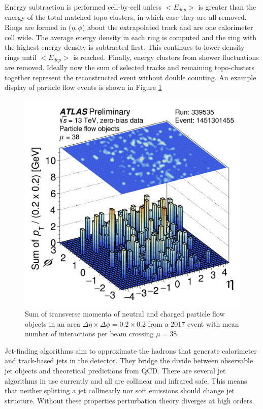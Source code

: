 Energy subtraction is performed cell-by-cell unless $<E_{dep}>$ is greater than the energy of the total matched topo-clusters, in which case they are all removed. Rings are formed in ($\eta,\phi$) about the extrapolated track and are one calorimeter cell wide. The average energy density in each ring is computed and the ring with the highest energy density is subtracted first. This continues to lower density rings until $<E_{dep}>$ is reached. Finally, energy clusters from shower fluctuations are removed. Ideally now the sum of selected tracks and remaining topo-clusters together represent the reconstructed event without double counting. An example display of particle flow events is shown in Figure \ref{fig:ParticleFlowExample}

\begin{figure}[!h]
        \centering
    \includegraphics[width=.4\textwidth]{Pictures/ParticleFlowExample.png}
    \caption{Sum of transverse momenta of neutral and charged particle flow objects in an area $\Delta \eta \times \Delta\phi = 0.2 \times 0.2$ from a 2017 event with mean number of interactions per beam crossing $\mu=38$ \cite{JETEtmiss}}
    \label{fig:ParticleFlowExample}
\end{figure}

Jet-finding algorithms aim to approximate the hadrons that generate calorimeter and track-based jets in the detector. They bridge the divide between observable jet objects and theoretical predictions from QCD. There are several jet algorithms in use currently and all are collinear and infrared safe. This means that neither splitting a jet collinearly nor soft emissions should change jet structure. Without these properties perturbation theory diverges at high orders.

